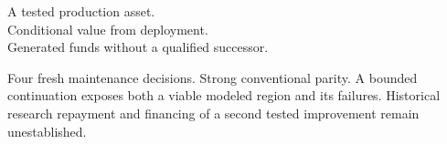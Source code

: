 {\large A tested production asset.\\Conditional value from deployment.\\Generated funds without a qualified successor.\par}
\vspace{4mm}
{\small Four fresh maintenance decisions. Strong conventional parity.
A bounded continuation exposes both a viable modeled region and its failures.
Historical research repayment and financing of a second tested improvement
remain unestablished.\par}

